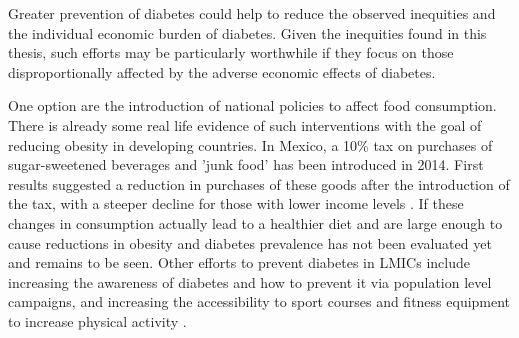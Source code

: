 Greater prevention of diabetes could help to reduce the observed inequities and the individual economic burden of diabetes. Given the inequities found in this thesis, such efforts may be particularly worthwhile if they focus on those disproportionally affected by the adverse economic effects of diabetes.

One option are the introduction of national policies to affect food consumption. There is already some real life evidence of such interventions with the goal of reducing obesity in developing countries. In Mexico, a 10\% tax on purchases of sugar-sweetened beverages and 'junk food' has been introduced in 2014. First results suggested a reduction in purchases of these goods after the introduction of the tax, with a steeper decline for those with lower income levels \parencite{Colchero2016,Batis2016}. If these changes in consumption actually lead to a healthier diet and are large enough to cause reductions in obesity and diabetes prevalence has not been evaluated yet and remains to be seen. Other efforts to prevent diabetes in \acp{LMIC} include increasing the awareness of diabetes and how to prevent it via population level campaigns, and  increasing the accessibility to sport courses and fitness equipment to increase physical activity \textcite{Cefalu2016}. 

